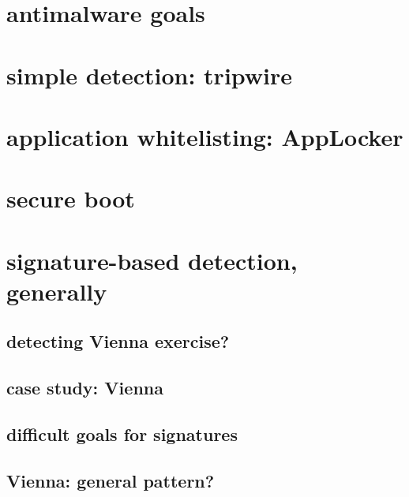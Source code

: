 \section{antimalware goals}


\section{simple detection: tripwire} 


\section{application whitelisting: AppLocker}


\section{secure boot}


\section{signature-based detection, generally}



\subsection{detecting Vienna exercise?}


\subsection{case study: Vienna}


\subsection{difficult goals for signatures}


\subsection{Vienna: general pattern?}



